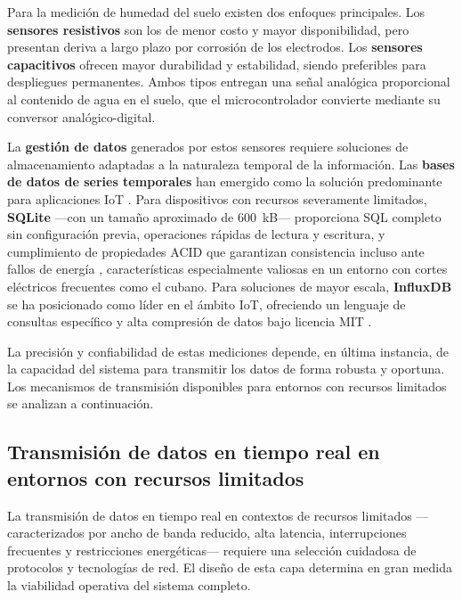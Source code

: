 Para la medición de humedad del suelo existen dos enfoques principales. Los \textbf{sensores resistivos} son los de menor costo y mayor disponibilidad, pero presentan deriva a largo plazo por corrosión de los electrodos. Los \textbf{sensores capacitivos} ofrecen mayor durabilidad y estabilidad, siendo preferibles para despliegues permanentes. Ambos tipos entregan una señal analógica proporcional al contenido de agua en el suelo, que el microcontrolador convierte mediante su conversor analógico-digital.

La \textbf{gestión de datos} generados por estos sensores requiere soluciones de almacenamiento adaptadas a la naturaleza temporal de la información. Las \textbf{bases de datos de series temporales} han emergido como la solución predominante para aplicaciones IoT \citep{shahroorei2024smart}. Para dispositivos con recursos severamente limitados, \textbf{SQLite} ---con un tamaño aproximado de 600~kB--- proporciona SQL completo sin configuración previa, operaciones rápidas de lectura y escritura, y cumplimiento de propiedades ACID que garantizan consistencia incluso ante fallos de energía \citep{shahroorei2024smart}, características especialmente valiosas en un entorno con cortes eléctricos frecuentes como el cubano. Para soluciones de mayor escala, \textbf{InfluxDB} se ha posicionado como líder en el ámbito IoT, ofreciendo un lenguaje de consultas específico y alta compresión de datos bajo licencia MIT \citep{shahroorei2024smart}.

La precisión y confiabilidad de estas mediciones depende, en última instancia, de la capacidad del sistema para transmitir los datos de forma robusta y oportuna. Los mecanismos de transmisión disponibles para entornos con recursos limitados se analizan a continuación.

\subsection{Transmisión de datos en tiempo real en entornos con recursos limitados}\label{subsec:transmision}

La transmisión de datos en tiempo real en contextos de recursos limitados ---caracterizados por ancho de banda reducido, alta latencia, interrupciones frecuentes y restricciones energéticas--- requiere una selección cuidadosa de protocolos y tecnologías de red. El diseño de esta capa determina en gran medida la viabilidad operativa del sistema completo.

